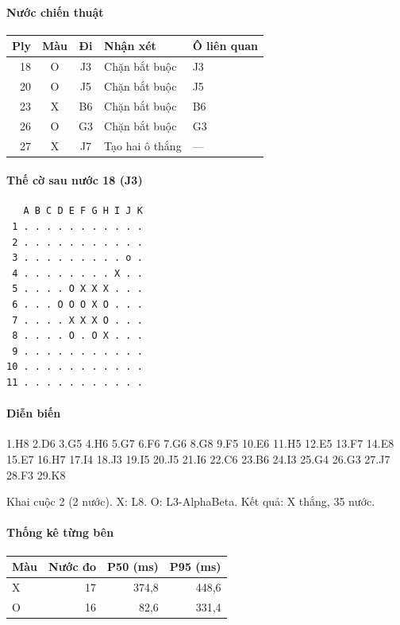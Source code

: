 \paragraph{Nước chiến thuật}
\begin{center}\small
\begin{tabular}{@{}rccll@{}}
\toprule
Ply & Màu & Đi & Nhận xét & Ô liên quan \\
\midrule
18 & O & J3 & Chặn bắt buộc & J3 \\
20 & O & J5 & Chặn bắt buộc & J5 \\
23 & X & B6 & Chặn bắt buộc & B6 \\
26 & O & G3 & Chặn bắt buộc & G3 \\
27 & X & J7 & Tạo hai ô thắng & — \\
\bottomrule
\end{tabular}
\end{center}
\paragraph{Thế cờ sau nước 18 (J3)}
\begin{verbatim}
   A B C D E F G H I J K
 1 . . . . . . . . . . .
 2 . . . . . . . . . . .
 3 . . . . . . . . . o .
 4 . . . . . . . . X . .
 5 . . . . O X X X . . .
 6 . . . O O O X O . . .
 7 . . . . X X X O . . .
 8 . . . . O . O X . . .
 9 . . . . . . . . . . .
10 . . . . . . . . . . .
11 . . . . . . . . . . .
\end{verbatim}
\paragraph{Diễn biến}
{\footnotesize 1.H8 2.D6 3.G5 4.H6 5.G7 6.F6 7.G6 8.G8 9.F5 10.E6 11.H5 12.E5 13.F7 14.E8 15.E7 16.H7 17.I4 18.J3 19.I5 20.J5 21.I6 22.C6 23.B6 24.I3 25.G4 26.G3 27.J7 28.F3 29.K8\par}
Khai cuộc 2 (2 nước). X: L8. O: L3-AlphaBeta. Kết quả: X thắng, 35 nước.
\paragraph{Thống kê từng bên}
\begin{center}\small
\begin{tabular}{@{}lrrr@{}}
\toprule
Màu & Nước đo & P50 (ms) & P95 (ms) \\
\midrule
X & 17 & 374,8 & 448,6 \\
O & 16 & 82,6 & 331,4 \\
\bottomrule
\end{tabular}
\end{center}
